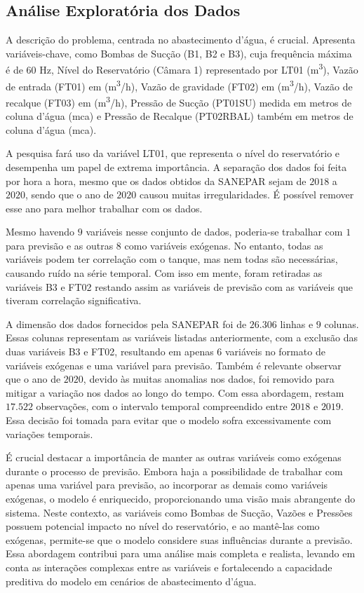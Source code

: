 \subsection{An\'alise Explorat\'oria dos Dados}


A descrição do problema, centrada no abastecimento d'água, é crucial. Apresenta variáveis-chave, como Bombas de Sucção (B1, B2 e B3), cuja frequência máxima é de $60$ Hz, Nível do Reservatório (Câmara 1) representado por LT01 (\si{m^3}), Vazão de entrada (FT01) em (\si{m^3/h}), Vazão de gravidade (FT02) em (\si{m^3/h}), Vazão de recalque (FT03) em (\si{m^3/h}), Pressão de Sucção (PT01SU) medida em metros de coluna d'água (\si{mca}) e Pressão de Recalque (PT02RBAL) também em metros de coluna d'água (\si{mca}).

A pesquisa fará uso da variável LT01, que representa o nível do reservatório e desempenha um papel de extrema importância. A separação dos dados foi feita por hora a hora, mesmo que os dados obtidos da SANEPAR sejam de $2018$ a $2020$, sendo que o ano de $2020$ causou muitas irregularidades. É possível remover esse ano para melhor trabalhar com os dados.

Mesmo havendo $9$ variáveis nesse conjunto de dados, poderia-se trabalhar com $1$ para previsão e as outras 8 como variáveis exógenas. No entanto, todas as variáveis podem ter correlação com o tanque, mas nem todas são necessárias, causando ruído na série temporal. Com isso em mente, foram retiradas as variáveis B3 e FT02 restando assim as variáveis de previsão com as variáveis que tiveram correlação significativa.

A dimensão dos dados fornecidos pela SANEPAR foi de $26.306$ linhas e $9$ colunas. Essas colunas representam as variáveis listadas anteriormente, com a exclusão das duas variáveis B3 e FT02, resultando em apenas 6 variáveis no formato de variáveis exógenas e uma variável para previsão. Também é relevante observar que o ano de $2020$, devido às muitas anomalias nos dados, foi removido para mitigar a variação nos dados ao longo do tempo. Com essa abordagem, restam $17.522$ observações, com o intervalo temporal compreendido entre $2018$ e $2019$. Essa decisão foi tomada para evitar que o modelo sofra excessivamente com variações temporais.

É crucial destacar a importância de manter as outras variáveis como exógenas durante o processo de previsão. Embora haja a possibilidade de trabalhar com apenas uma variável para previsão, ao incorporar as demais como variáveis exógenas, o modelo é enriquecido, proporcionando uma visão mais abrangente do sistema. Neste contexto, as variáveis como Bombas de Sucção, Vazões e Pressões possuem potencial impacto no nível do reservatório, e ao mantê-las como exógenas, permite-se que o modelo considere suas influências durante a previsão. Essa abordagem contribui para uma análise mais completa e realista, levando em conta as interações complexas entre as variáveis e fortalecendo a capacidade preditiva do modelo em cenários de abastecimento d'água.

